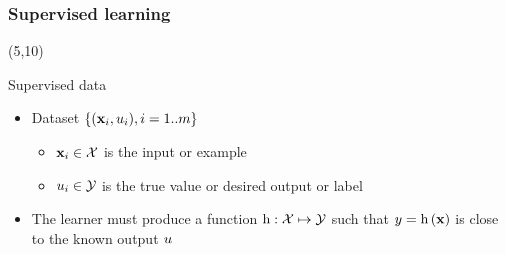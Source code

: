 \begin{frame}
  \frametitle{Supervised learning}

  \begin{textblock}{90}(5,10)
     \begin{block}{Supervised data}
       \begin{itemize}
       \item Dataset
         $\left \lbrace {\ensuremath{\left ( {\mathbf{x}_{i}}, {u_{i}} \right )}} , {i=1..m} \right \rbrace$
         \begin{itemize}
         \item $\mathbf{x}_i \in \mathcal{X}$ is the input or example
         \item $u_i \in \mathcal{Y}$ is the true value or desired output or label
         \end{itemize}
       \item The learner must produce a function $\mathrm{h}: \mathcal{X} \mapsto \mathcal{Y}$
         such that $y = \mathrm{h} \left ( {\mathbf{x}} \right )$ is close to the known output
         $u$
       \end{itemize}
     \end{block}
  \end{textblock}


\end{frame}
